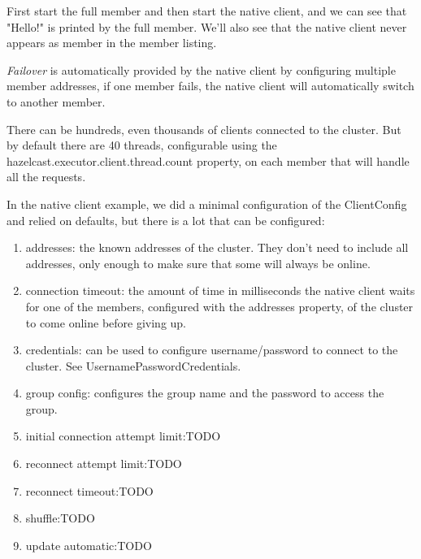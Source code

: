 First start the full member and then start the native client, and we can see that "Hello!" is printed by the full member. We'll also see that the native client never appears as member in the member listing.	
 
\emph{Failover} is automatically provided by the native client by configuring multiple member addresses, if one member fails, the native client will automatically switch to another member.

There can be hundreds, even thousands of clients connected to the cluster. But by default there are 40 threads, configurable using the hazelcast.executor.client.thread.count property, on each member that will handle all the requests. 

In the native client example, we did a minimal configuration of the ClientConfig and relied on defaults, but there is a lot that can be configured:
\begin{enumerate}
\item addresses: the known addresses of the cluster. They don't need to include all addresses, only enough to make sure that some will always be online.
\item connection timeout: the amount of time in milliseconds the native client waits for one of the members, configured with the addresses property, of the cluster to come online before giving up.
\item credentials: can be used to configure username/password to connect to the cluster. See UsernamePasswordCredentials.
\item group config: configures the group name and the password to access the group.
\item initial connection attempt limit:TODO
\item reconnect attempt limit:TODO
\item reconnect timeout:TODO
\item shuffle:TODO
\item update automatic:TODO
\end{enumerate}

